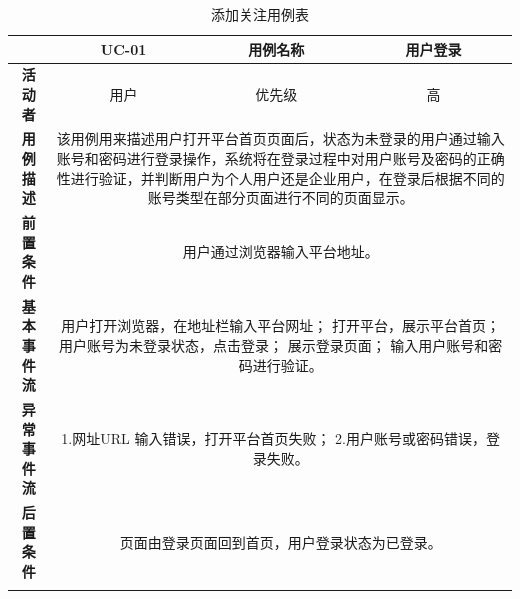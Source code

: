 \begin{longtable}[c]{c|ccc}
	\caption{添加关注用例表}
	\label{tab:tab12}\\
	\shline
	\multicolumn{1}{c|}{\textbf{用例编号}} & \multicolumn{1}{c|}{UC-01} & \multicolumn{1}{c|}{用例名称} &  用户登录\\ \hline
	\endhead
	\multicolumn{1}{c|}{\textbf{活动者}} & \multicolumn{1}{c|}{用户} & \multicolumn{1}{c|}{优先级} &高  \\ \hline
	\textbf{用例描述} & \multicolumn{3}{p{12cm}}{该用例用来描述用户打开平台首页页面后，状态为未登录的用户通过输入账号和密码进行登录操作，系统将在登录过程中对用户账号及密码的正确性进行验证，并判断用户为个人用户还是企业用户，在登录后根据不同的账号类型在部分页面进行不同的页面显示。} \\ \hline
	\textbf{前置条件}& \multicolumn{3}{p{12cm}}{用户通过浏览器输入平台地址。} \\ \hline
	\textbf{基本事件流}& \multicolumn{3}{p{12cm}}{用户打开浏览器，在地址栏输入平台网址；\newline
		打开平台，展示平台首页；\newline
		用户账号为未登录状态，点击登录；\newline
		展示登录页面；\newline
		输入用户账号和密码进行验证。} \\ \hline
	\textbf{异常事件流}& \multicolumn{3}{p{12cm}}{1.网址URL 输入错误，打开平台首页失败；\newline
		2.用户账号或密码错误，登录失败。
	} \\ \hline
	\textbf{后置条件}& \multicolumn{3}{p{12cm}}{页面由登录页面回到首页，用户登录状态为已登录。} \\ \shline
\end{longtable}

